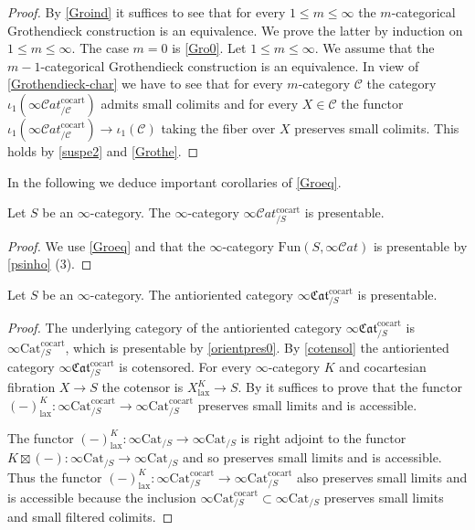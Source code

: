 \documentclass[10pt,oneside]{article}
\numberwithin{equation}{section} %
\numberwithin{figure}{section} %
\theoremstyle{plain}
\theoremstyle{definition}
\newcommand{\mC}{{\mathcal C}}
\newcommand{\m}{{m}}
\newcommand{\Cat}{\mathrm{Cat}}
\newcommand{\Fun}{\mathrm{Fun}}
\newcommand{\cocart}{{\mathrm{cocart}}}
\newcommand{\lax}{{\mathrm{lax}}}
\newcommand{\scat}{\mathcal{C}\mathit{at}}
\newcommand{\fcat}{\mathfrak{Cat}}
\begin{document}
\begin{proof}
By \cref{Groind} it suffices to see that for every $1 \leq \m \leq \infty$ the $m$-categorical Grothendieck construction is an equivalence.
We prove the latter by induction on $1 \leq \m \leq \infty$.
The case $m=0$ is \cref{Gro0}. Let $1 \leq \m \leq \infty.$
We assume that the $m-1$-categorical Grothendieck construction is an equivalence. 
In view of \cref{Grothendieck-char} we have to see that for every $m$-category $\mC$ the category $\iota_1(\infty\scat^\cocart_{/\mC})$ admits small colimits and for every $X \in \mC$ the functor
$\iota_1(\infty\scat^\cocart_{/\mC}) \to \iota_1(\mC)$
taking the fiber over $X$ preserves small colimits.
This holds by \cref{suspe2} and \cref{Grothe}.
\end{proof}


In the following we deduce important corollaries of \cref{Groeq}.

\begin{corollary}\label{orientpres0}
Let $S$ be an $\infty$-category.
The $\infty$-category $\infty\scat^\cocart_{/S}$
is presentable.

\end{corollary}

\begin{proof}

We use \cref{Groeq} and that the $\infty$-category $\Fun(S,\infty\scat)$
is presentable by \cref{psinho} (3).
\end{proof}

\begin{corollary}\label{orientpres}
Let $S$ be an $\infty$-category.
The antioriented category $\infty\fcat^\cocart_{/S}$
is presentable.

\end{corollary}

\begin{proof}

The underlying category of the antioriented category $\infty\mathfrak{Cat}^\cocart_{/S}$
is $\infty\Cat^\cocart_{/S}$, which is presentable by \cref{orientpres0}.
By \cref{cotensol} the antioriented category $\infty\mathfrak{Cat}^\cocart_{/S}$ is cotensored.
For every $\infty$-category $K$ and cocartesian fibration
$X \to S$ the cotensor is $X_\lax^K \to S.$
By \cite[Lemma 3.69.]{heine2024higher} it suffices to prove that 
the functor $(-)^{K}_\lax: \infty\Cat_{/S}^\cocart \to  \infty\Cat_{/S}^\cocart $ preserves small limits and is accessible.

The functor $(-)^{K}_\lax: \infty\Cat_{/S} \to \infty\Cat_{/S} $
is right adjoint to the functor $K \boxtimes (-): \infty\Cat_{/S} \to \infty\Cat_{/S}$
and so preserves small limits and is accessible.
Thus the functor $(-)^{K}_\lax: \infty\Cat_{/S}^\cocart \to  \infty\Cat_{/S}^\cocart $ also preserves small limits and is accessible because the inclusion $\infty\Cat_{/S}^\cocart \subset \infty\Cat_{/S} $ preserves small limits and small filtered colimits.
\end{proof}
\end{document}
